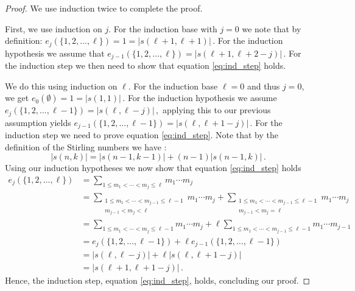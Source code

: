 \documentclass{article}
\begin{document}
\begin{proof}
We use induction twice to complete the proof.

First, we use induction on $j$.
For the induction base with $j=0$ we note that by definition:
$e_j(\{ 1, 2, \dots, \ell \}) = 1 = |s(\ell+1, \ell+1)| \,.$
For the induction hypothesis we assume that
$e_{j-1} ( \{ 1, 2, \dots, \ell \}) = |s(\ell+1, \ell+2-j)| \,.$
For the induction step we then need to show that equation \ref{eq:ind_step} holds.

We do this using induction on $\ell$.
For the induction base $\ell=0$ and thus $j=0$, we get
$e_0 ( \emptyset ) = 1 = |s(1, 1)|\,.$
For the induction hypothesis we assume
$e_j (\{ 1, 2, \dots, \ell-1 \}) = |s(\ell, \ell-j)| \,, \nonumber$
applying this to our previous assumption yields
$e_{j-1} (\{ 1, 2, \dots, \ell-1 \}) = |s(\ell, \ell+1-j)| \,.$
For the induction step we need to prove equation \ref{eq:ind_step}.
Note that by the definition of the Stirling numbers we have \cite[equation 15]{stirling_def}:
\begin{equation}
    |s(n,k)| = |s(n-1, k-1)| + (n-1) |s(n-1, k)| \,. \nonumber
\end{equation}
Using our induction hypotheses we now show that equation \ref{eq:ind_step} holds
\begin{align}
    e_j(\{ 1, 2, \dots, \ell \}) &= \sum_{1 \leq m_1 < \cdots < m_{j} \leq \ell} m_1 \cdots m_j \nonumber \\
                                 &= \sum_{\substack{1 \leq m_1 < \cdots < m_{j-1} \leq \ell-1 \\ m_{j-1} < m_j < \ell}} m_1 \cdots m_j + \sum_{\substack{1 \leq m_1 < \cdots < m_{j-1} \leq \ell-1 \\ m_{j-1} < m_j = \ell}} m_1 \cdots m_j \nonumber \\
                                 &= \sum_{1 \leq m_1 < \cdots < m_{j} \leq \ell-1} m_1 \cdots m_j + \ell \sum_{1 \leq m_1 < \cdots < m_{j-1} \leq \ell-1} m_1 \cdots m_{j-1} \nonumber \\
                                 &= e_j(\{ 1, 2, \dots, \ell-1 \}) + \ell e_{j-1}(\{ 1, 2, \dots, \ell-1 \}) \nonumber \\
                                 &= |s(\ell, \ell-j)| + \ell |s(\ell, \ell+1-j)| \nonumber \\
                                 &= |s(\ell+1, \ell+1-j)|\,. \nonumber
\end{align}
Hence, the induction step, equation \ref{eq:ind_step}, holds, concluding our proof.
\end{proof}
\end{document}
